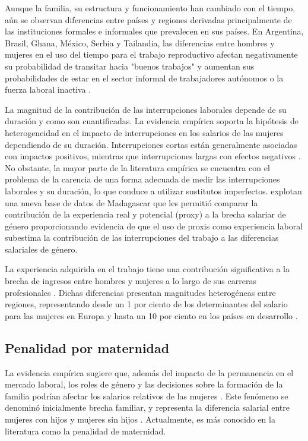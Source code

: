 Aunque la familia, su estructura y funcionamiento han cambiado con el tiempo, aún se observan diferencias entre países y regiones derivadas principalmente de las instituciones formales e informales que prevalecen en sus países. En Argentina, Brasil, Ghana, México, Serbia y Tailandia, las diferencias entre hombres y mujeres en el uso del tiempo para el trabajo reproductivo afectan negativamente su probabilidad de transitar hacia "buenos trabajos" y aumentan sus probabilidades de estar en el sector informal de trabajadores autónomos o la fuerza laboral inactiva \citep{Bosch2010}.

La magnitud de la contribución de las interrupciones laborales depende de su duración y como son cuantificadas. La evidencia empírica soporta la hipótesis de heterogeneidad en el impacto de interrupciones en los salarios de las mujeres dependiendo de su duración. Interrupciones cortas están generalmente asociadas con impactos positivos, mientras que interrupciones largas con efectos negativos \citep{Blau2000,Ruhm1998,Waldfogel1998}. No obstante, la mayor parte de la literatura empírica se encuentra con el problema de la carencia de una forma adecuada de medir las interrupciones laborales y su duración, lo que conduce a utilizar sustitutos imperfectos. \citet{Nordman2016} explotan una nueva base de datos de Madagascar que les permitió comparar la contribución de la experiencia real y potencial (proxy) a la brecha salariar de género proporcionando evidencia de que el uso de proxis como experiencia laboral subestima la contribución de las interrupciones del trabajo a las diferencias salariales de género.

La experiencia adquirida en el trabajo tiene una contribución significativa a la brecha de ingresos entre hombres y mujeres a lo largo de sus carreras profesionales \citep{Kleven2019}.  Dichas diferencias presentan magnitudes heterogéneas entre regiones, representando desde un 1 por ciento de los determinantes del salario para las mujeres en Europa y hasta un 10 por ciento en los países en desarrollo \citep{Weichselbaumer2005}. 
\subsection{Penalidad por maternidad}                        
La evidencia empírica sugiere que, además del impacto de la permanencia en el mercado laboral, los roles de género y las decisiones sobre la formación de la familia podrían afectar los salarios relativos de las mujeres \citep{Blau2017}. Este fenómeno se denominó inicialmente brecha familiar, y representa la diferencia salarial entre mujeres con hijos y mujeres sin hijos \citep{Waldfogel1998}. Actualmente, es más conocido en la literatura como la penalidad de maternidad.

